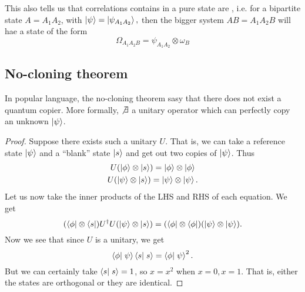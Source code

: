This also tells us that correlations contains in a pure state are , i.e. for a bipartite state $A=A_1 A_2$, with $\left| \psi \right>=\left| \psi_{A_1A_2} \right>,$ then the bigger system $AB=A_1 A_2 B$ will hae a state of the form
\begin{equation}
    \Omega_{A_1A_2B} = \psi_{A_1A_2} \otimes \omega_B
\end{equation}
\subsection*{No-cloning theorem} In popular language, the no-cloning theorem sasy that there does not exist a quantum copier. More formally, $\not\exists$ a unitary operator which can perfectly copy an unknown $\left| \psi \right>$.

\begin{proof}
    Suppose there exists such a unitary $U$. That is, we can take a reference state $\left| \psi \right>$ and a ``blank'' state $\left| s \right>$ and get out two copies of $\left| \psi \right>$. Thus
    \begin{gather}
        U(\left| \phi \right>\otimes \left| s \right>)=\left| \phi \right> \otimes \left| \phi \right>\\
        U(\left| \psi \right>\otimes \left| s \right>)= \left| \psi \right>\otimes \left| \psi \right>.
    \end{gather}
    Let us now take the inner products of the LHS and RHS of each equation. We get
    \begin{equation}
        (\left< \phi \right|\otimes \left< s \right|)U^\dagger U (\left| \psi \right>\otimes \left| s \right>) =(\left< \phi \right| \otimes \left< \phi \right|)(\left| \psi \right>\otimes \left| \psi \right>).
    \end{equation}
    Now we see that since $U$ is a unitary, we get
    \begin{equation}
        \braket{\phi}{\psi}\braket{s}{s}=\braket{\phi}{\psi}^2.
    \end{equation}
    But we can certainly take $\braket{s}{s}=1$, so $x=x^2$ when $x=0,x=1$. That is, either the states are orthogonal or they are identical.
    

\end{proof}
